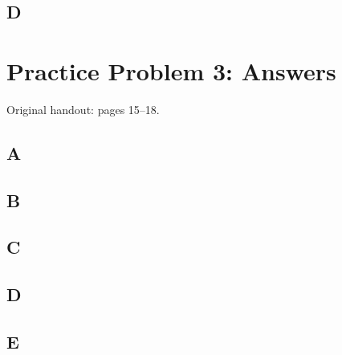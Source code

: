 \documentclass[letterpaper,12pt]{article}
\newcommand{\handout}[1]{%
  
}
\newenvironment{answer}{\par}{\par\medskip}
\begin{document}
\subsection*{D}
\begin{answer}
  \vspace{2cm}
\end{answer}

\clearpage

\handout{15-18}
\section*{Practice Problem 3: Answers}
\noindent Original handout: pages 15--18.\par

\subsection*{A}
\begin{answer}
  \vspace{2cm}
\end{answer}

\subsection*{B}
\begin{answer}
  \vspace{2cm}
\end{answer}

\subsection*{C}
\begin{answer}
  \vspace{2cm}
\end{answer}

\subsection*{D}
\begin{answer}
  \vspace{2cm}
\end{answer}

\subsection*{E}
\begin{answer}
  \vspace{2cm}
\end{answer}
\end{document}

